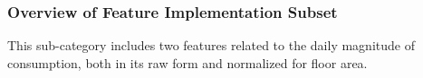 \subsubsection{Overview of Feature Implementation Subset}

This sub-category includes two features related to the daily magnitude of consumption, both in its raw form and normalized for floor area.